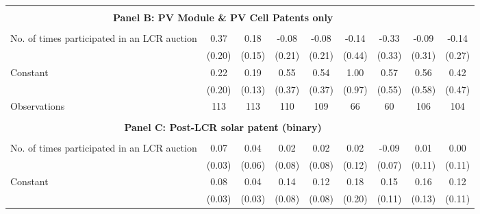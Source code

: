 \begin{table}[htbp]
\begin{tabular}{l*{8}{c}}
\hline \\ \multicolumn{8}{c}{\textbf{Panel B: PV Module \& PV Cell Patents only}} \\\\[-1ex]
No. of times participated in an LCR auction&        0.37\sym{*}  &        0.18         &       -0.08         &       -0.08         &       -0.14         &       -0.33         &       -0.09         &       -0.14         \\
                    &      (0.20)         &      (0.15)         &      (0.21)         &      (0.21)         &      (0.44)         &      (0.33)         &      (0.31)         &      (0.27)         \\
[1em]
Constant            &        0.22         &        0.19         &        0.55         &        0.54         &        1.00         &        0.57         &        0.56         &        0.42         \\
                    &      (0.20)         &      (0.13)         &      (0.37)         &      (0.37)         &      (0.97)         &      (0.55)         &      (0.58)         &      (0.47)         \\
\hline
Observations        &         113         &         113         &         110         &         109         &          66         &          60         &         106         &         104         \\
\hline \\ \multicolumn{8}{c}{\textbf{Panel C: Post-LCR solar patent (binary)}} \\\\[-1ex]
No. of times participated in an LCR auction&        0.07\sym{*}  &        0.04         &        0.02         &        0.02         &        0.02         &       -0.09         &        0.01         &        0.00         \\
                    &      (0.03)         &      (0.06)         &      (0.08)         &      (0.08)         &      (0.12)         &      (0.07)         &      (0.11)         &      (0.11)         \\
[1em]
Constant            &        0.08\sym{**} &        0.04         &        0.14\sym{*}  &        0.12         &        0.18         &        0.15         &        0.16         &        0.12         \\
                    &      (0.03)         &      (0.03)         &      (0.08)         &      (0.08)         &      (0.20)         &      (0.11)         &      (0.13)         &      (0.11)         \\

\end{tabular}
\end{table}

